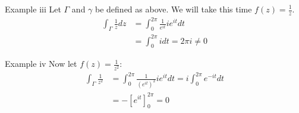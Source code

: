 	\begin{parag}{Example iii}
	    Let $\Gamma$ and $\gamma$ be defined as above. We will take this time $f\left(z\right) = \frac{1}{z}$.
		\begin{align*} 
			\int_\Gamma \frac{1}{z}dz &= \int_0^{2\pi}\frac{1}{e^{it}}ie^{it}dt\\
									  &=  \int_0^{2\pi}idt = 2\pi i \neq 0
		\end{align*}
	\end{parag}
	\begin{parag}{Example iv}
		Now let $f\left(z\right) = \frac{1}{z^2}$:
		\begin{align*} 
			\int_\Gamma \frac{1}{z^2} &=  \int_0^{2\pi}\frac{1}{\left(e^{it}\right)^2}ie^{it}dt = i\int_0^{2\pi}e^{-it}dt\\
									  &= -\left[e^{it}\right]_0^{2\pi} = 0
		\end{align*}
	\end{parag}
	
	

	
	
	
